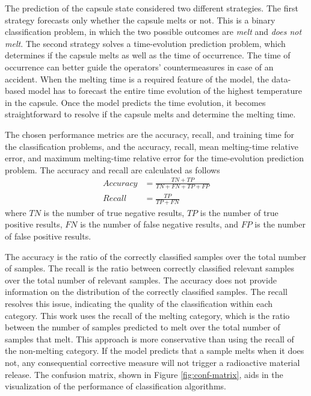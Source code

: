 The prediction of the capsule state considered two different strategies.
The first strategy forecasts only whether the capsule melts or not.
This is a binary classification problem, in which the two possible outcomes are \textit{melt} and \textit{does not melt}.
The second strategy solves a time-evolution prediction problem, which determines if the capsule melts as well as the time of occurrence.
The time of occurrence can better guide the operators’ countermeasures in case of an accident.
When the melting time is a required feature of the model, the data-based model has to forecast the entire time evolution of the highest temperature in the capsule.
Once the model predicts the time evolution, it becomes straightforward to resolve if the capsule melts and determine the melting time.

The chosen performance metrics are the accuracy, recall, and training time for the classification problems, and the accuracy, recall, mean melting-time relative error, and maximum melting-time relative error for the time-evolution prediction problem.
The accuracy and recall are calculated as follows
\begin{align}
Accuracy &= \frac{TN + TP}{TN + FN + TP + FP} \\
Recall &= \frac{TP}{TP + FN}
\end{align}
where $TN$ is the number of true negative results, $TP$ is the number of true positive results, $FN$ is the number of false negative results, and $FP$ is the number of false positive results.

The accuracy is the ratio of the correctly classified samples over the total number of samples.
The recall is the ratio between correctly classified relevant samples over the total number of relevant samples.
The accuracy does not provide information on the distribution of the correctly classified samples.
The recall resolves this issue, indicating the quality of the classification within each category.
This work uses the recall of the melting category, which is the ratio between the number of samples predicted to melt over the total number of samples that melt.
This approach is more conservative than using the recall of the non-melting category.
If the model predicts that a sample melts when it does not, any consequential corrective measure will not trigger a radioactive material release.
The confusion matrix, shown in Figure \ref{fig:conf-matrix}, aids in the visualization of the performance of classification algorithms.

